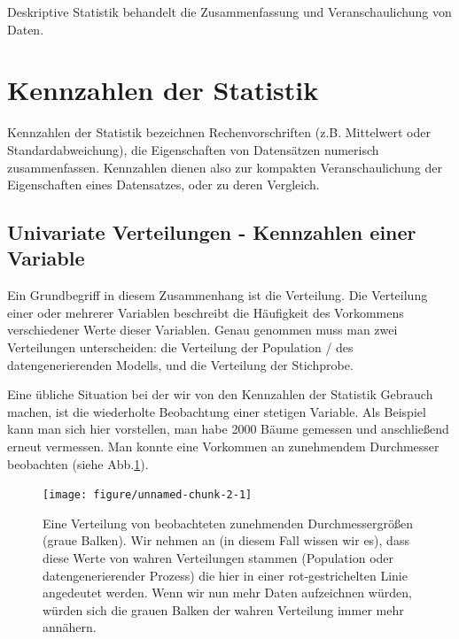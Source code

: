 \documentclass[a4paper,twoside]{tufte-book}\usepackage[]{graphicx}\usepackage[]{color}
\begin{document}
	Deskriptive Statistik behandelt die Zusammenfassung und Veranschaulichung von Daten.
	
	\section{Kennzahlen der Statistik}
	
	Kennzahlen der Statistik bezeichnen Rechenvorschriften (z.B. Mittelwert oder Standardabweichung), die Eigenschaften von Datensätzen numerisch zusammenfassen. Kennzahlen dienen also zur kompakten Veranschaulichung der Eigenschaften eines Datensatzes, oder zu deren Vergleich.
	
	\subsection{Univariate Verteilungen - Kennzahlen einer Variable}
	
	Ein Grundbegriff in diesem Zusammenhang ist die Verteilung. Die Verteilung einer oder mehrerer Variablen beschreibt die Häufigkeit des Vorkommens verschiedener Werte dieser Variablen. Genau genommen muss man zwei Verteilungen unterscheiden: die Verteilung der Population / des datengenerierenden Modells, und die Verteilung der Stichprobe. 	
	
	
	Eine übliche Situation bei der wir von den Kennzahlen der Statistik Gebrauch machen, ist die wiederholte Beobachtung einer stetigen Variable. Als Beispiel kann man sich hier vorstellen, man habe 2000 Bäume gemessen und anschließend erneut vermessen. Man konnte eine Vorkommen an zunehmendem Durchmesser beobachten (siehe Abb.\ref{fig: data distribution}).


\begin{figure}[htbp]
\begin{center}
\begin{Schunk}

\texttt{[image: figure/unnamed-chunk-2-1]} \end{Schunk}
\caption{Eine Verteilung von beobachteten zunehmenden Durchmessergrößen (graue Balken). Wir nehmen an (in diesem Fall wissen wir es), dass diese Werte von wahren Verteilungen stammen (Population oder datengenerierender Prozess) die hier in einer rot-gestrichelten Linie angedeutet werden. Wenn wir nun mehr Daten aufzeichnen würden, würden sich die grauen Balken der wahren Verteilung immer mehr annähern.}
\label{fig: data distribution}
\end{center}
\end{figure}
\end{document}
